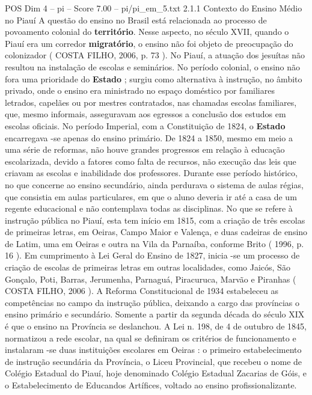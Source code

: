 \begin{textsample}{POS Dim 4 – pi – Score 7.00 – pi/pi\_em\_5.txt}  \label{ex:f4_pos_128}
2.1.1 Contexto do Ensino Médio no Piauí A questão do ensino no Brasil está relacionada ao processo de povoamento colonial do \textbf{território}.
Nesse aspecto, no século XVII, quando o Piauí era um corredor \textbf{migratório}, o ensino não foi objeto de preocupação do colonizador ( COSTA FILHO, 2006, p. 73 ).
No Piauí, a atuação dos jesuítas não resultou na instalação de escolas e seminários.
No período colonial, o ensino não fora uma prioridade do \textbf{Estado} ; surgiu como alternativa à instrução, no âmbito privado, onde o ensino era ministrado no espaço doméstico por familiares letrados, capelães ou por mestres contratados, nas chamadas escolas familiares, que, mesmo informais, asseguravam aos egressos a conclusão dos estudos em escolas oficiais.
No período Imperial, com a Constituição de 1824, o \textbf{Estado} encarregava -se apenas do ensino primário.
De 1824 a 1850, mesmo em meio a uma série de reformas, não houve grandes progressos em relação à educação escolarizada, devido a fatores como falta de recursos, não execução das leis que criavam as escolas e inabilidade dos professores.
Durante esse período histórico, no que concerne ao ensino secundário, ainda perdurava o sistema de aulas régias, que consistia em aulas particulares, em que o aluno deveria ir até a casa de um regente educacional e não contemplava todas as disciplinas.
No que se refere à instrução pública no Piauí, esta tem início em 1815, com a criação de três escolas de primeiras letras, em Oeiras, Campo Maior e Valença, e duas cadeiras de ensino de Latim, uma em Oeiras e outra na Vila da Parnaíba, conforme Brito ( 1996, p. 16 ).
Em cumprimento à Lei Geral do Ensino de 1827, inicia -se um processo de criação de escolas de primeiras letras em outras localidades, como Jaicós, São Gonçalo, Poti, Barras, Jerumenha, Parnaguá, Piracuruca, Marvão e Piranhas ( COSTA FILHO, 2006 ).
A Reforma Constitucional de 1934 estabeleceu as competências no campo da instrução pública, deixando a cargo das províncias o ensino primário e secundário.
Somente a partir da segunda década do século XIX é que o ensino na Província se deslanchou.
A Lei n. 198, de 4 de outubro de 1845, normatizou a rede escolar, na qual se definiram os critérios de funcionamento e instalaram -se duas instituições escolares em Oeiras : o primeiro estabelecimento de instrução secundária da Província, o Liceu Provincial, que recebeu o nome de Colégio Estadual do Piauí, hoje denominado Colégio Estadual Zacarias de Góis, e o Estabelecimento de Educandos Artífices, voltado ao ensino profissionalizante.

\end{textsample}
